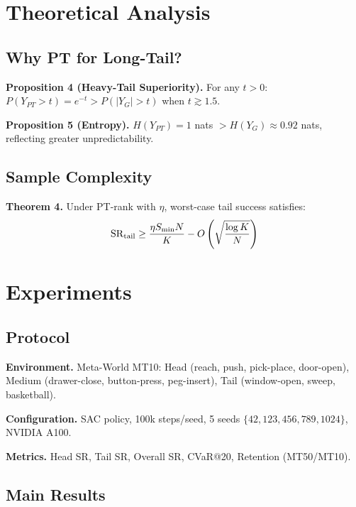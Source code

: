 \documentclass[10pt,twocolumn]{article}
\begin{document}
\section{Theoretical Analysis}

\subsection{Why PT for Long-Tail?}

\textbf{Proposition 4 (Heavy-Tail Superiority).} For any $t > 0$: $P(Y_{PT} > t) = e^{-t} > P(|Y_G| > t)$ when $t \gtrsim 1.5$.

\textbf{Proposition 5 (Entropy).} $H(Y_{PT}) = 1$ nats $> H(Y_G) \approx 0.92$ nats, reflecting greater unpredictability.

\subsection{Sample Complexity}

\textbf{Theorem 4.} Under PT-rank with $\eta$, worst-case tail success satisfies:
\begin{equation}
{\rm SR}_{\rm tail} \geq \frac{\eta S_{\min} N}{K} - O\left(\sqrt{\frac{\log K}{N}}\right)
\end{equation}

\section{Experiments}

\subsection{Protocol}

\textbf{Environment.} Meta-World MT10: Head (reach, push, pick-place, door-open), Medium (drawer-close, button-press, peg-insert), Tail (window-open, sweep, basketball).

\textbf{Configuration.} SAC policy, 100k steps/seed, 5 seeds $\{42, 123, 456, 789, 1024\}$, NVIDIA A100.

\textbf{Metrics.} Head SR, Tail SR, Overall SR, CVaR@20, Retention (MT50/MT10).

\subsection{Main Results}
\end{document}
